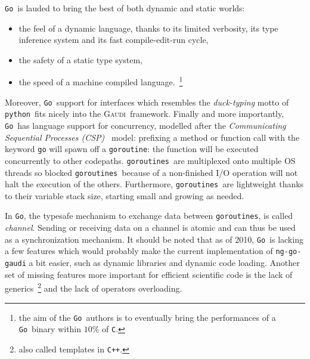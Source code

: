 \documentclass[a4paper]{jpconf}
\newcommand{\gaudi}{\textsc{Gaudi}}
\newcommand{\python}{\texttt{python}}
\newcommand{\golang}{\texttt{Go}}
\newcommand{\goroutine}{\texttt{goroutine}}
\newcommand{\goroutines}{\texttt{goroutines}}
\begin{document}

\golang\ is lauded to bring the best of both dynamic and static worlds:
\begin{itemize}
\item the feel of a dynamic language, thanks to its limited verbosity,
  its type inference system and its fast compile-edit-run cycle,
\item the safety of a static type system,
\item the speed of a machine compiled language.~\footnote{the aim of
  the \golang\ authors is to eventually bring the performances of a
  \golang\ binary within $10\%$ of \texttt{C}.}
\end{itemize}

Moreover, \golang\ support for interfaces which resembles the
\emph{duck-typing} motto of \python\ fits nicely into the \gaudi\
framework.
Finally and more importantly, \golang\ has language support for
concurrency, modelled after the \emph{Communicating Sequential Processes
  (CSP)}~\cite{ref-csp} model: prefixing a method or function call
with the keyword \texttt{go} will spawn off a \goroutine: the
function will be executed concurrently to other codepaths.
\goroutines\ are multiplexed onto multiple OS threads so
blocked \goroutines\ because of a non-finished I/O operation
will not halt the execution of the others.
Furthermore, \goroutines\ are lightweight thanks to their
variable stack size, starting small and growing as needed.

In \golang, the typesafe mechanism to exchange data between
\goroutines, is called \emph{channel}.
Sending or receiving data on a channel is atomic and can thus be used
as a synchronization mechanism.
It should be noted that as of 2010, \golang\ is lacking a few features
which would probably make the current implementation of
\texttt{ng-go-gaudi} a bit easier, such as dynamic libraries and
dynamic code loading.
Another set of missing features more important for efficient
scientific code is the lack of generics~\footnote{also called
  templates in \texttt{C++}.} and the lack of operators overloading.
\end{document}
